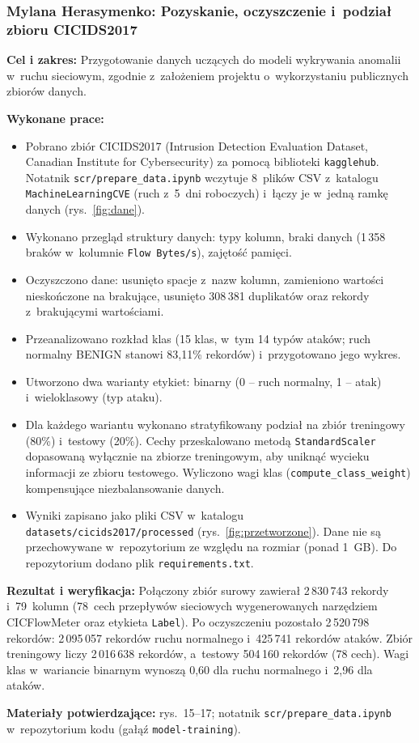 \documentclass[11pt,a4paper,oneside]{article}
\newcommand{\studentC}{{Mylana Herasymenko}}
\begin{document}
\subsubsection{\studentC: Pozyskanie, oczyszczenie i~podział zbioru CICIDS2017}\label{zadanie-dane}
\textbf{Cel i zakres:} Przygotowanie danych uczących do modeli wykrywania anomalii w~ruchu sieciowym, zgodnie z~założeniem projektu o~wykorzystaniu publicznych zbiorów danych.\par
\textbf{Wykonane prace:}
\begin{itemize}
\item Pobrano zbiór CICIDS2017 (Intrusion Detection Evaluation Dataset, Canadian Institute for Cybersecurity) za pomocą biblioteki \texttt{kagglehub}. Notatnik \nolinkurl{scr/prepare_data.ipynb} wczytuje 8~plików CSV z~katalogu \texttt{MachineLearningCVE} (ruch z~5~dni roboczych) i~łączy je w~jedną ramkę danych (rys.~\ref{fig:dane}).
\item Wykonano przegląd struktury danych: typy kolumn, braki danych (1\,358 braków w~kolumnie \texttt{Flow Bytes/s}), zajętość pamięci.
\item Oczyszczono dane: usunięto spacje z~nazw kolumn, zamieniono wartości nieskończone na brakujące, usunięto 308\,381 duplikatów oraz rekordy z~brakującymi wartościami.
\item Przeanalizowano rozkład klas (15 klas, w~tym 14 typów ataków; ruch normalny BENIGN stanowi 83,11\% rekordów) i~przygotowano jego wykres.
\item Utworzono dwa warianty etykiet: binarny (0 -- ruch normalny, 1 -- atak) i~wieloklasowy (typ ataku).
\item Dla każdego wariantu wykonano stratyfikowany podział na zbiór treningowy (80\%) i~testowy (20\%). Cechy przeskalowano metodą \texttt{StandardScaler} dopasowaną wyłącznie na zbiorze treningowym, aby uniknąć wycieku informacji ze zbioru testowego. Wyliczono wagi klas (\texttt{compute\_class\_weight}) kompensujące niezbalansowanie danych.
\item Wyniki zapisano jako pliki CSV w~katalogu \nolinkurl{datasets/cicids2017/processed} (rys.~\ref{fig:przetworzone}). Dane nie są przechowywane w~repozytorium ze względu na rozmiar (ponad 1~GB). Do repozytorium dodano plik \nolinkurl{requirements.txt}.
\end{itemize}
\textbf{Rezultat i weryfikacja:} Połączony zbiór surowy zawierał 2\,830\,743 rekordy i~79~kolumn (78~cech przepływów sieciowych wygenerowanych narzędziem CICFlowMeter oraz etykieta \texttt{Label}). Po oczyszczeniu pozostało 2\,520\,798 rekordów: 2\,095\,057 rekordów ruchu normalnego i~425\,741 rekordów ataków. Zbiór treningowy liczy 2\,016\,638 rekordów, a~testowy 504\,160 rekordów (78 cech). Wagi klas w~wariancie binarnym wynoszą 0,60 dla ruchu normalnego i~2,96 dla ataków.\par
\textbf{Materiały potwierdzające:} rys.~15--17; notatnik \nolinkurl{scr/prepare_data.ipynb} w~repozytorium kodu (gałąź \texttt{model-training}).
\end{document}

